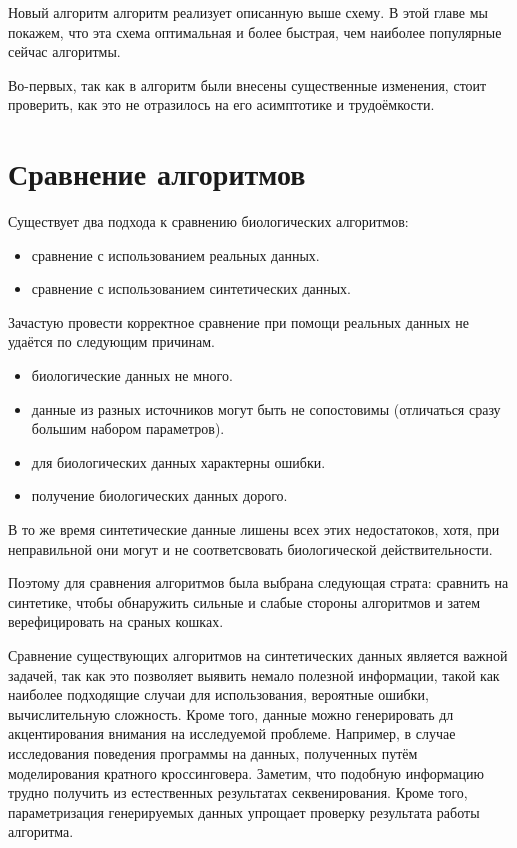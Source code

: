 \documentclass{matmex-diploma-custom}
\begin{document}
Новый алгоритм алгоритм реализует описанную выше схему. В этой главе мы
покажем, что эта схема оптимальная и более быстрая, чем наиболее
популярные сейчас алгоритмы.

Во-первых, так как в алгоритм были внесены существенные изменения,
стоит проверить, как это не отразилось на его асимптотике и
трудоёмкости.

\section{Сравнение алгоритмов}

Существует два подхода к сравнению биологических алгоритмов:
\begin{itemize}
\item сравнение с использованием реальных данных.
\item сравнение с использованием синтетических данных.
\end{itemize}

Зачастую провести корректное сравнение при помощи реальных данных не
удаётся по следующим причинам.

\begin{itemize}
\item биологические данных не много.
\item данные из разных источников могут быть не сопостовимы (отличаться
  сразу большим набором параметров).
\item для биологических данных характерны ошибки.
\item получение биологических данных дорого.
\end{itemize}

В то же время синтетические данные лишены всех этих недостатоков,
хотя, при неправильной они могут и не соответсвовать биологической
действительности.

Поэтому для сравнения алгоритмов была выбрана следующая страта:
сравнить на синтетике, чтобы обнаружить сильные и слабые стороны
алгоритмов и затем верефицировать на сраных кошках.

Сравнение существующих алгоритмов на синтетических данных является
важной задачей, так как это позволяет выявить немало полезной
информации, такой как наиболее подходящие случаи для использования,
вероятные ошибки, вычислительную сложность. Кроме того, данные можно
генерировать дл акцентирования внимания на исследуемой
проблеме. Например, в случае исследования поведения программы на
данных, полученных путём моделирования кратного
кроссинговера. Заметим, что подобную информацию трудно получить из
естественных результатах секвенирования. Кроме того, параметризация
генерируемых данных упрощает проверку результата работы алгоритма.
\end{document}
